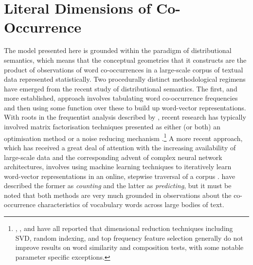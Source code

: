 \section{Literal Dimensions of Co-Occurrence}
The model presented here is grounded within the paradigm of distributional semantics, which means that the conceptual geometries that it constructs are the product of observations of word co-occurrences in a large-scale corpus of textual data represented statistically.  Two procedurally distinct methodological regimens have emerged from the recent study of distributional semantics.  The first, and more established, approach involves tabulating word co-occurrence frequencies and then using some function over these to build up word-vector representations.  With roots in the frequentist analysis described by \cite{SaltonEA1975}, recent research has typically involved matrix factorisation techniques presented as either (or both) an optimisation method \citep{BullinariaEA2012} or a noise reducing mechanism \citep{KielaEA2014}.\footnote{\cite{BullinariaEA2012}, \cite{LapesaEA2013}, and \cite{KielaEA2014} have all reported that dimensional reduction techniques including SVD, random indexing, and top frequency feature selection generally do not improve results on word similarity and composition tests, with some notable parameter specific exceptions.}  A more recent approach, which has received a great deal of attention with the increasing availability of large-scale data and the corresponding advent of complex neural network architectures, involves using machine learning techniques to iteratively learn word-vector representations in an online, stepwise traversal of a corpus \citep{BengioEA2003,CollobertEA2008,KalchbrennerEA2014}.  \cite{BaroniEA2014} have described the former as \emph{counting} and the latter as \emph{predicting}, but it must be noted that both methods are very much grounded in observations about the co-occurrence characteristics of vocabulary words across large bodies of text.


